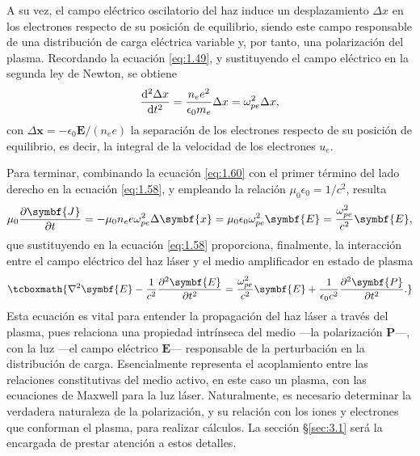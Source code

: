 A su vez, el campo eléctrico oscilatorio del haz induce un desplazamiento $\Delta x$ en los electrones respecto de su posición de equilibrio, siendo este campo responsable de una distribución de carga eléctrica variable y, por tanto, una polarización del plasma. Recordando la ecuación \eqref{eq:1.49}, y sustituyendo el campo eléctrico en la segunda ley de Newton, se obtiene
\begin{equation}\label{eq:1.60}
  \frac{\operatorname{d^{2}}\!\Delta x}{\operatorname{d}\!{t}^{2}} = \frac{n_{e}e^{2}}{\epsilon_{0}m_{e}} \Delta x = \omega^{2}_{pe} \Delta x,
\end{equation}
con $\Delta \symbf{x} = - \epsilon_{0} \symbf{E}/(n_{e}e)$ la separación de los electrones respecto de su posición de equilibrio, es decir, la integral de la velocidad de los electrones $u_{e}$.

Para terminar, combinando la ecuación \eqref{eq:1.60} con el primer término del lado derecho en la ecuación \eqref{eq:1.58}, y empleando la relación $\mu_{0} \epsilon_{0} = 1/c^{2}$, resulta
\begin{equation}\label{eq:1.61}
  \mu_{0}\pdv{\symbf{J}}{t} = -\mu_{0}n_{e}e \omega^{2}_{pe} \Delta \symbf{x} = \mu_{0} \epsilon_{0} \omega^{2}_{pe} \symbf{E} = \frac{\omega^{2}_{pe}}{c^{2}} \symbf{E},
\end{equation}
que sustituyendo en la ecuación \eqref{eq:1.58} proporciona, finalmente, la interacción entre el campo eléctrico del haz láser y el medio amplificador en estado de plasma
\begin{equation}\label{eq:1.62}
  \tcboxmath{\laplacian \symbf{E} - \frac{1}{c^{2}}\pdvN{\symbf{E}}{t}{2} = \frac{\omega^{2}_{pe}}{c^{2}}\symbf{E} + \frac{1}{\epsilon_{0}c^{2}}\pdvN{\symbf{P}}{t}{2}.}\end{equation}
Esta ecuación es vital para entender la propagación del haz láser a través del plasma, pues relaciona una propiedad intrínseca del medio ---la polarización $\symbf{P}$---, con la luz ---el campo eléctrico $\symbf{E}$--- responsable de la perturbación en la distribución de carga. Esencialmente representa el acoplamiento entre las relaciones constitutivas del medio activo, en este caso un plasma, con las ecuaciones de Maxwell para la luz láser. Naturalmente, es necesario determinar la verdadera naturaleza de la polarización, y su relación con los iones y electrones que conforman el plasma, para realizar cálculos. La sección \S\ref{sec:3.1} será la encargada de prestar atención a estos detalles.

